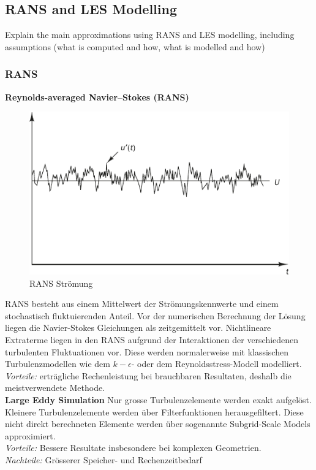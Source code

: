 \documentclass[a4paper]{scrartcl}
\begin{document}
\subsection{RANS and LES Modelling}
Explain the main approximations using RANS
and LES modelling, including assumptions (what is computed and how, what is modelled and how)
\subsubsection{RANS}
\textbf{Reynolds-averaged Navier–Stokes (RANS)}

\begin{figure}[h]
\begin{center}
\includegraphics[scale=1]{images/51.pdf}
\caption{RANS Strömung}
\label{fig:51}
\end{center}
\end{figure}

RANS besteht aus einem Mittelwert der Strömungskennwerte und einem stochastisch
fluktuierenden Anteil. Vor der numerischen Berechnung der Lösung liegen die
Navier-Stokes Gleichungen als zeitgemittelt vor. Nichtlineare Extraterme liegen
in den RANS aufgrund der Interaktionen der verschiedenen turbulenten Fluktuationen vor.
Diese werden normalerweise mit klassischen Turbulenzmodellen wie dem
$k-\epsilon$- oder dem Reynoldsstress-Modell modelliert.
\\
\textit{Vorteile:} erträgliche Rechenleistung bei brauchbaren Resultaten,
deshalb die meistverwendete Methode. \\
\vspace{0.5cm}
\textbf{Large Eddy Simulation}
Nur grosse Turbulenzelemente werden exakt aufgelöst. Kleinere Turbulenzelemente
werden über Filterfunktionen herausgefiltert. Diese nicht direkt berechneten
Elemente werden über sogenannte Subgrid-Scale Models approximiert. \\
\vspace{0.5cm}
\textit{Vorteile:} Bessere Resultate insbesondere bei komplexen Geometrien. \\
\textit{Nachteile:} Grösserer Speicher- und Rechenzeitbedarf
\end{document}
